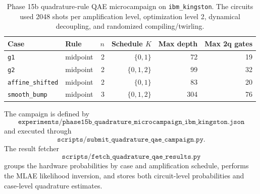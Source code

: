 \begin{table}[h]
\centering
\begin{tabular}{llrrrr}
\toprule
Case & Rule & \(n\) & Schedule \(K\) & Max depth & Max 2q gates \\
\midrule
\texttt{g1} & midpoint & 2 & \(\{0,1\}\) & 72 & 19 \\
\texttt{g2} & midpoint & 2 & \(\{0,1,2\}\) & 99 & 32 \\
\texttt{affine\_shifted} & midpoint & 2 & \(\{0,1\}\) & 83 & 20 \\
\texttt{smooth\_bump} & midpoint & 3 & \(\{0,1,2\}\) & 304 & 76 \\
\bottomrule
\end{tabular}
\caption{Phase 15b quadrature-rule QAE microcampaign on
\texttt{ibm\_kingston}. The circuits used 2048 shots per amplification level,
optimization level 2, dynamical decoupling, and randomized compiling/twirling.}
\label{tab:phase15b-campaign}
\end{table}

The campaign is defined by
\[
  \texttt{experiments/phase15b\_quadrature\_microcampaign\_ibm\_kingston.json}
\]
and executed through
\[
  \texttt{scripts/submit\_quadrature\_qae\_campaign.py}.
\]
The result fetcher
\[
  \texttt{scripts/fetch\_quadrature\_qae\_results.py}
\]
groups the hardware probabilities by case and amplification schedule, performs
the MLAE likelihood inversion, and stores both circuit-level probabilities and
case-level quadrature estimates.
